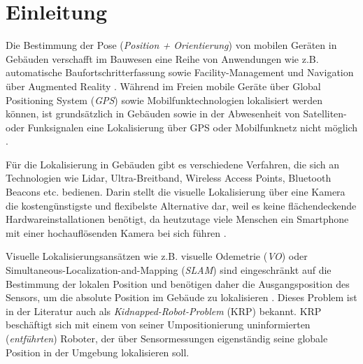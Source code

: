 
\section{Einleitung}
%
%
%
%
%
%
%
%
%
%
%
%
%
%




Die Bestimmung der Pose (\textit{Position + Orientierung}) von mobilen Geräten in Gebäuden verschafft im Bauwesen eine Reihe von Anwendungen wie z.B. automatische Baufortschritterfassung sowie Facility-Management und Navigation über Augmented Reality \cite{kroppModelbasedPoseEstimation2016, kochNaturalMarkersAugmented2014}.
Während im Freien mobile Geräte über Global Positioning System (\textit{GPS}) sowie Mobilfunktechnologien lokalisiert werden können, ist grundsätzlich in Gebäuden sowie in der Abwesenheit von Satelliten- oder Funksignalen eine Lokalisierung über GPS oder Mobilfunknetz nicht möglich \cite{yassinRecentAdvancesIndoor2016}. 

Für die Lokalisierung in Gebäuden gibt es verschiedene Verfahren, die sich an Technologien wie Lidar, Ultra-Breitband, Wireless Access Points, Bluetooth Beacons etc. bedienen. Darin stellt die visuelle Lokalisierung über eine Kamera die kostengünstigste und flexibelste Alternative dar, weil es keine flächendeckende Hardwareinstallationen benötigt, da heutzutage viele Menschen ein Smartphone mit einer hochauflösenden Kamera bei sich führen \cite{wuImageBasedCamera2016}.

Visuelle Lokalisierungsansätzen wie z.B. 
visuelle Odemetrie (\textit{VO}) oder Simultaneous-Localization-and-Mapping (\textit{SLAM}) sind eingeschränkt auf die Bestimmung der lokalen Position und benötigen daher die Ausgangsposition des Sensors, um die absolute Position im Gebäude zu lokalisieren \cite{stephenseGlobalLocalizationUsing2002}. Dieses Problem ist in der Literatur auch als \textit{Kidnapped-Robot-Problem} (KRP) bekannt. KRP beschäftigt sich mit einem von seiner Umpositionierung uninformierten (\textit{entführten}) Roboter, der über Sensormessungen eigenständig seine globale Position in der Umgebung lokalisieren soll.


